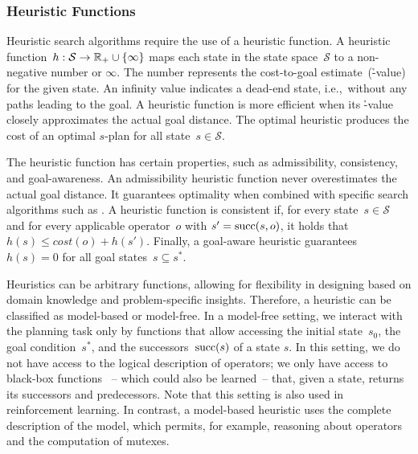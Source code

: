 \subsubsection{Heuristic Functions}
\label{sec:heuristic-functions}

Heuristic search algorithms require the use of a heuristic function. A heuristic function~$h:\mathcal{S}\rightarrow\mathbb{R}_{+}\cup\{\infty\}$ maps each state in the state space~$\mathcal{S}$ to a non-negative number or $\infty$. The number represents the cost-to-goal estimate~(\h-value) for the given state. An infinity value indicates a dead-end state, i.e.,~without any paths leading to the goal. A heuristic function is more efficient when its \h-value closely approximates the actual goal distance. The optimal heuristic \hstar produces the cost of an optimal $s$-plan for all state~$s \in \mathcal{S}$.

The heuristic function has certain properties, such as admissibility, consistency, and goal-awareness. An admissibility heuristic function never overestimates the actual goal distance. It guarantees optimality when combined with specific search algorithms such as \astar. A heuristic function is consistent if, for every state~$s \in \mathcal{S}$ and for every applicable operator~$o$ with $s' = \operatorname{succ}(s,o)$, it holds that $h(s) \leq cost(o) + h(s')$. Finally, a goal-aware heuristic guarantees $h(s) = 0$ for all goal states~$s \subseteq s^*$.

Heuristics can be arbitrary functions, allowing for flexibility in designing based on domain knowledge and problem-specific insights. Therefore, a heuristic can be classified as model-based or model-free. In a model-free setting, we interact with the planning task only by functions that allow accessing the initial state~$s_0$, the goal condition~$s^*$, and the successors~$\operatorname{succ}(s)$ of a state $s$. In this setting, we do not have access to the logical description of operators; we only have access to black-box functions~\cite{sturtevant2019exponential} -- which could also be learned~-- that, given a state, returns its successors and predecessors. Note that this setting is also used in reinforcement learning.
In contrast, a model-based heuristic uses the complete description of the model, which permits, for example, reasoning about operators and the computation of mutexes.

